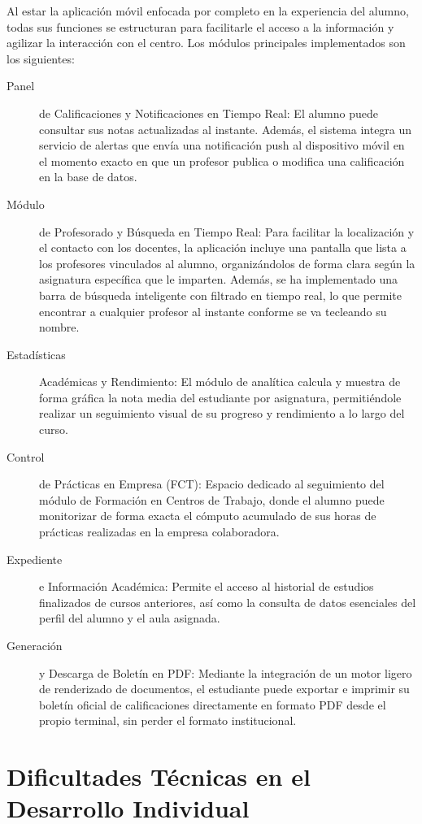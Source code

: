 \documentclass[spanish]{report}
\begin{document}
Al estar la aplicación móvil enfocada por completo en la experiencia
del alumno, todas sus funciones se estructuran para facilitarle el
acceso a la información y agilizar la interacción con el centro. Los
módulos principales implementados son los siguientes:
\begin{description}
\item [{Panel}] de Calificaciones y Notificaciones en Tiempo Real: El alumno
puede consultar sus notas actualizadas al instante. Además, el sistema
integra un servicio de alertas que envía una notificación push al
dispositivo móvil en el momento exacto en que un profesor publica
o modifica una calificación en la base de datos.
\item [{Módulo}] de Profesorado y Búsqueda en Tiempo Real: Para facilitar
la localización y el contacto con los docentes, la aplicación incluye
una pantalla que lista a los profesores vinculados al alumno, organizándolos
de forma clara según la asignatura específica que le imparten. Además,
se ha implementado una barra de búsqueda inteligente con filtrado
en tiempo real, lo que permite encontrar a cualquier profesor al instante
conforme se va tecleando su nombre.
\item [{Estadísticas}] Académicas y Rendimiento: El módulo de analítica
calcula y muestra de forma gráfica la nota media del estudiante por
asignatura, permitiéndole realizar un seguimiento visual de su progreso
y rendimiento a lo largo del curso.
\item [{Control}] de Prácticas en Empresa (FCT): Espacio dedicado al seguimiento
del módulo de Formación en Centros de Trabajo, donde el alumno puede
monitorizar de forma exacta el cómputo acumulado de sus horas de prácticas
realizadas en la empresa colaboradora.
\item [{Expediente}] e Información Académica: Permite el acceso al historial
de estudios finalizados de cursos anteriores, así como la consulta
de datos esenciales del perfil del alumno y el aula asignada.
\item [{Generación}] y Descarga de Boletín en PDF: Mediante la integración
de un motor ligero de renderizado de documentos, el estudiante puede
exportar e imprimir su boletín oficial de calificaciones directamente
en formato PDF desde el propio terminal, sin perder el formato institucional.
\end{description}

\section{Dificultades Técnicas en el Desarrollo Individual}
\end{document}
